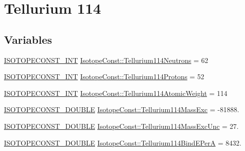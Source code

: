 \hypertarget{group___isotope_const-_tellurium-_te114}{}\section{Tellurium 114}
\label{group___isotope_const-_tellurium-_te114}
\subsection*{Variables}
\begin{DoxyCompactItemize}
\item 
\mbox{\hyperlink{group___isotope_const-_macros_ga5f18360b3e99483a35c32d789e62621c}{I\+S\+O\+T\+O\+P\+E\+C\+O\+N\+S\+T\+\_\+\+I\+NT}} \mbox{\hyperlink{group___isotope_const-_tellurium-_te114_ga892b02227522be62a6609e079f1acc87}{Isotope\+Const\+::\+Tellurium114\+Neutrons}} = 62
\item 
\mbox{\hyperlink{group___isotope_const-_macros_ga5f18360b3e99483a35c32d789e62621c}{I\+S\+O\+T\+O\+P\+E\+C\+O\+N\+S\+T\+\_\+\+I\+NT}} \mbox{\hyperlink{group___isotope_const-_tellurium-_te114_ga5efb931d5a29f8989a1d13e9d89f470d}{Isotope\+Const\+::\+Tellurium114\+Protons}} = 52
\item 
\mbox{\hyperlink{group___isotope_const-_macros_ga5f18360b3e99483a35c32d789e62621c}{I\+S\+O\+T\+O\+P\+E\+C\+O\+N\+S\+T\+\_\+\+I\+NT}} \mbox{\hyperlink{group___isotope_const-_tellurium-_te114_ga6b7bceee64265b56cb0777b5911e55e6}{Isotope\+Const\+::\+Tellurium114\+Atomic\+Weight}} = 114
\item 
\mbox{\hyperlink{group___isotope_const-_macros_ga8f45a7272ce02c0b4c65c44636ed719a}{I\+S\+O\+T\+O\+P\+E\+C\+O\+N\+S\+T\+\_\+\+D\+O\+U\+B\+LE}} \mbox{\hyperlink{group___isotope_const-_tellurium-_te114_ga8f348e810c2b635dd01e22b663a6a925}{Isotope\+Const\+::\+Tellurium114\+Mass\+Exc}} = -\/81888.
\item 
\mbox{\hyperlink{group___isotope_const-_macros_ga8f45a7272ce02c0b4c65c44636ed719a}{I\+S\+O\+T\+O\+P\+E\+C\+O\+N\+S\+T\+\_\+\+D\+O\+U\+B\+LE}} \mbox{\hyperlink{group___isotope_const-_tellurium-_te114_ga57b9ae62ec4e04c8a4d64ebc9e7ab36a}{Isotope\+Const\+::\+Tellurium114\+Mass\+Exc\+Unc}} = 27.
\item 
\mbox{\hyperlink{group___isotope_const-_macros_ga8f45a7272ce02c0b4c65c44636ed719a}{I\+S\+O\+T\+O\+P\+E\+C\+O\+N\+S\+T\+\_\+\+D\+O\+U\+B\+LE}} \mbox{\hyperlink{group___isotope_const-_tellurium-_te114_ga27e07428d94e63168ab3ed2f3d359b46}{Isotope\+Const\+::\+Tellurium114\+Bind\+E\+PerA}} = 8432.
\item 

\end{DoxyCompactItemize}
